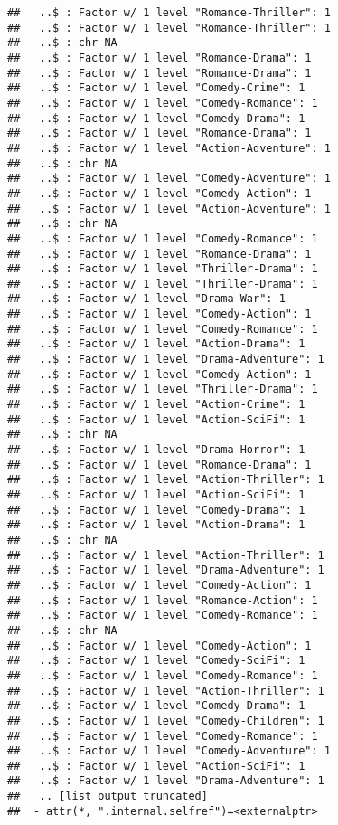 \documentclass[
]{article}
\begin{document}
\begin{verbatim}
##   ..$ : Factor w/ 1 level "Romance-Thriller": 1
##   ..$ : Factor w/ 1 level "Romance-Thriller": 1
##   ..$ : chr NA
##   ..$ : Factor w/ 1 level "Romance-Drama": 1
##   ..$ : Factor w/ 1 level "Romance-Drama": 1
##   ..$ : Factor w/ 1 level "Comedy-Crime": 1
##   ..$ : Factor w/ 1 level "Comedy-Romance": 1
##   ..$ : Factor w/ 1 level "Comedy-Drama": 1
##   ..$ : Factor w/ 1 level "Romance-Drama": 1
##   ..$ : Factor w/ 1 level "Action-Adventure": 1
##   ..$ : chr NA
##   ..$ : Factor w/ 1 level "Comedy-Adventure": 1
##   ..$ : Factor w/ 1 level "Comedy-Action": 1
##   ..$ : Factor w/ 1 level "Action-Adventure": 1
##   ..$ : chr NA
##   ..$ : Factor w/ 1 level "Comedy-Romance": 1
##   ..$ : Factor w/ 1 level "Romance-Drama": 1
##   ..$ : Factor w/ 1 level "Thriller-Drama": 1
##   ..$ : Factor w/ 1 level "Thriller-Drama": 1
##   ..$ : Factor w/ 1 level "Drama-War": 1
##   ..$ : Factor w/ 1 level "Comedy-Action": 1
##   ..$ : Factor w/ 1 level "Comedy-Romance": 1
##   ..$ : Factor w/ 1 level "Action-Drama": 1
##   ..$ : Factor w/ 1 level "Drama-Adventure": 1
##   ..$ : Factor w/ 1 level "Comedy-Action": 1
##   ..$ : Factor w/ 1 level "Thriller-Drama": 1
##   ..$ : Factor w/ 1 level "Action-Crime": 1
##   ..$ : Factor w/ 1 level "Action-SciFi": 1
##   ..$ : chr NA
##   ..$ : Factor w/ 1 level "Drama-Horror": 1
##   ..$ : Factor w/ 1 level "Romance-Drama": 1
##   ..$ : Factor w/ 1 level "Action-Thriller": 1
##   ..$ : Factor w/ 1 level "Action-SciFi": 1
##   ..$ : Factor w/ 1 level "Comedy-Drama": 1
##   ..$ : Factor w/ 1 level "Action-Drama": 1
##   ..$ : chr NA
##   ..$ : Factor w/ 1 level "Action-Thriller": 1
##   ..$ : Factor w/ 1 level "Drama-Adventure": 1
##   ..$ : Factor w/ 1 level "Comedy-Action": 1
##   ..$ : Factor w/ 1 level "Romance-Action": 1
##   ..$ : Factor w/ 1 level "Comedy-Romance": 1
##   ..$ : chr NA
##   ..$ : Factor w/ 1 level "Comedy-Action": 1
##   ..$ : Factor w/ 1 level "Comedy-SciFi": 1
##   ..$ : Factor w/ 1 level "Comedy-Romance": 1
##   ..$ : Factor w/ 1 level "Action-Thriller": 1
##   ..$ : Factor w/ 1 level "Comedy-Drama": 1
##   ..$ : Factor w/ 1 level "Comedy-Children": 1
##   ..$ : Factor w/ 1 level "Comedy-Romance": 1
##   ..$ : Factor w/ 1 level "Comedy-Adventure": 1
##   ..$ : Factor w/ 1 level "Action-SciFi": 1
##   ..$ : Factor w/ 1 level "Drama-Adventure": 1
##   .. [list output truncated]
##  - attr(*, ".internal.selfref")=<externalptr>
\end{verbatim}
\end{document}
